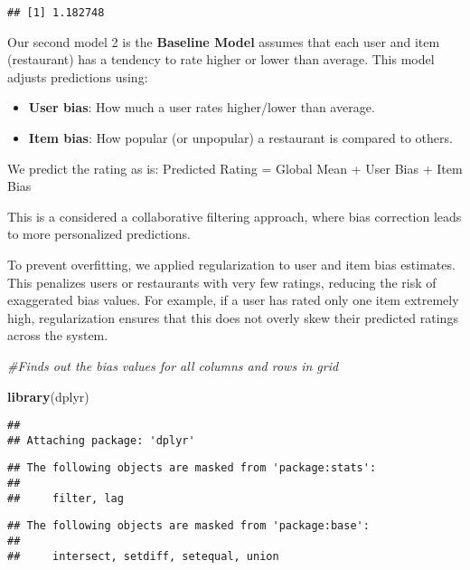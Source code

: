 \documentclass[
]{article}
\newenvironment{Shaded}{\begin{snugshade}}{\end{snugshade}}
\newcommand{\CommentTok}[1]{\textcolor[rgb]{0.56,0.35,0.01}{\textit{#1}}}
\newcommand{\FunctionTok}[1]{\textcolor[rgb]{0.13,0.29,0.53}{\textbf{#1}}}
\newcommand{\NormalTok}[1]{#1}
\begin{document}
\begin{verbatim}
## [1] 1.182748
\end{verbatim}

Our second model 2 is the \textbf{Baseline Model} assumes that each user
and item (restaurant) has a tendency to rate higher or lower than
average. This model adjusts predictions using:

\begin{itemize}
\item
  \textbf{User bias}: How much a user rates higher/lower than average.
\item
  \textbf{Item bias}: How popular (or unpopular) a restaurant is
  compared to others.
\end{itemize}

We predict the rating as is: Predicted Rating = Global Mean + User Bias
+ Item Bias

This is a considered a collaborative filtering approach, where bias
correction leads to more personalized predictions.

To prevent overfitting, we applied regularization to user and item bias
estimates. This penalizes users or restaurants with very few ratings,
reducing the risk of exaggerated bias values. For example, if a user has
rated only one item extremely high, regularization ensures that this
does not overly skew their predicted ratings across the system.

\begin{Shaded}
\begin{Highlighting}[]
\CommentTok{\#Finds out the bias values for all columns and rows in grid}

\FunctionTok{library}\NormalTok{(dplyr)}
\end{Highlighting}
\end{Shaded}

\begin{verbatim}
## 
## Attaching package: 'dplyr'
\end{verbatim}

\begin{verbatim}
## The following objects are masked from 'package:stats':
## 
##     filter, lag
\end{verbatim}

\begin{verbatim}
## The following objects are masked from 'package:base':
## 
##     intersect, setdiff, setequal, union
\end{verbatim}
\end{document}
